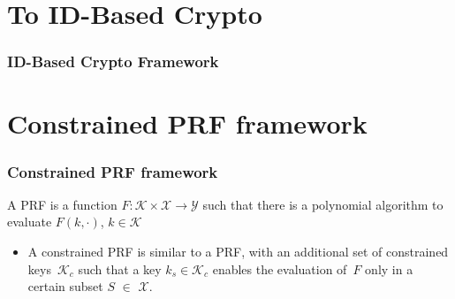 \documentclass{beamer}
\begin{document}
\section{To ID-Based Crypto}


\begin{frame}
    \frametitle{ID-Based Crypto Framework}
\end{frame}
\section{Constrained PRF framework}

\def\firstcircle{(0,0) circle (1.5cm)}
\def\secondcircle{(0,-1) circle (0.5cm)}

\begin{frame}
\frametitle{Constrained PRF framework}

    \begin{definition} {
            A PRF is a function $F : \mathcal{K} \times \mathcal{X} \rightarrow \mathcal{Y}$ such that there is
            a polynomial algorithm to evaluate $F(k, \cdot)$, $k \in \mathcal{K}$
        }
    \end{definition}

    \begin{itemize}
        \item
            A constrained PRF is similar to a PRF, with an additional set of constrained keys\
        $\mathcal{K}_c$ such that a key $k_s \in \mathcal{K}_c$ enables the evaluation of\
            $F$ only in a certain subset $S$ $\in$ $\mathcal{X}$.
    \end{itemize}
    \begin{figure}

    \end{figure}

\end{frame}



\end{document}
